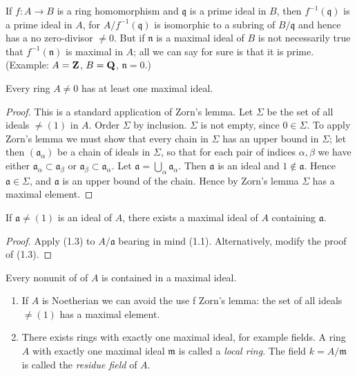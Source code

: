 If $f\colon A\to B$ is a ring homomorphism and $\mathfrak{q}$ is
a prime ideal in $B$, then $f^{-1}(\mathfrak{q})$ is a prime
ideal in $A$, for $A/f^{-1}(\mathfrak{q})$ is isomorphic to a
subring of $B/\mathfrak{q}$ and hence has a no zero-divisor $\neq
0$. But if $\mathfrak{n}$ is a maximal ideal of $B$ is not
necessarily true that $f^{-1}(\mathfrak{n})$ is maximal in $A$;
all we can say for sure is that it is prime. (Example: $A=\mathbf{Z}$,
$B=\mathbf{Q}$, $\mathfrak{n}=0$.)
\begin{theorem}
Every ring $A\neq 0$ has at least one maximal ideal.
\end{theorem}
\begin{proof}
This is a standard application of Zorn's lemma. Let $\Sigma$ be
the set of all ideals $\neq(1)$ in $A$.  Order $\Sigma$ by
inclusion. $\Sigma$ is not empty, since $0\in\Sigma$. To apply
Zorn's lemma we must show that every chain in $\Sigma$ has an
upper bound in $\Sigma$; let then
$\left(\mathfrak{a}_\alpha\right)$ be a chain of ideals in
$\Sigma$, so that for each pair of indices $\alpha,\beta$ we have
either $\mathfrak{a}_\alpha\subset\mathfrak{a}_\beta$ or
$\mathfrak{a}_\beta\subset\mathfrak{a}_\alpha$. Let
$\mathfrak{a}=\bigcup_\alpha\mathfrak{a}_\alpha$. Then
$\mathfrak{a}$ is an ideal and $1\notin\mathfrak{a}$. Hence
$\mathfrak{a}\in\Sigma$, and $\mathfrak{a}$ is an upper bound of
the chain. Hence by Zorn's lemma $\Sigma$ has a maximal element.
\end{proof}
\begin{corollary}
If $\mathfrak{a}\neq(1)$ is an ideal of $A$, there exists a
maximal ideal of $A$ containing $\mathfrak{a}$.
\end{corollary}
\begin{proof}
Apply (1.3) to $A/\mathfrak{a}$ bearing in mind
(1.1). Alternatively, modify the proof of (1.3).
\end{proof}
\begin{corollary}
Every nonunit of of $A$ is contained in a maximal ideal.
\end{corollary}
\begin{remarks*}
\begin{enumerate}[noitemsep,label=(\arabic*)]
\item If $A$ is Noetherian we can avoid the use f Zorn's lemma:
  the set of all ideals $\neq (1)$ has a maximal element.
\item There exists rings with exactly one maximal ideal, for
  example fields. A ring $A$ with exactly one maximal ideal
  $\mathfrak{m}$ is called a \emph{local ring}. The field
  $k=A/\mathfrak{m}$ is called the \emph{residue field} of $A$.
\end{enumerate}
\end{remarks*}
